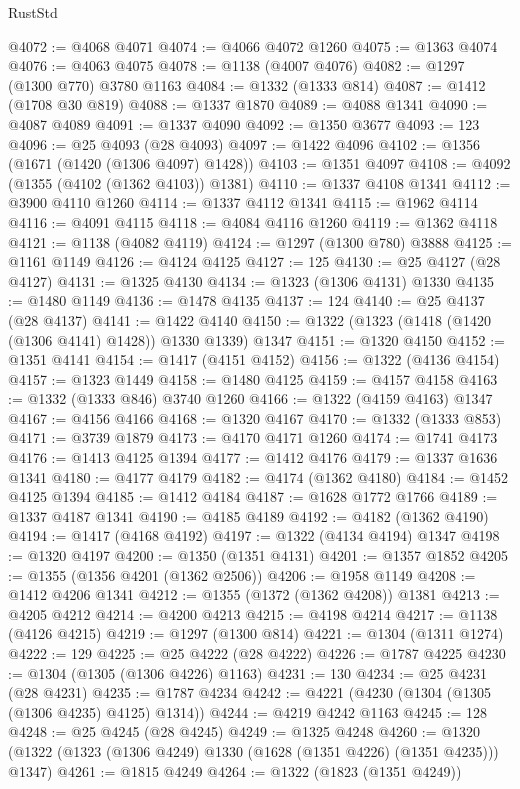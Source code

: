 \begin{lexlean}{RustStd}
\begin{coremodule}
{\begin{coremodule}
{{{{{{{{{{{{{{{{{{{{{{{{{{{{{{{{{{@4072 := @4068 @4071
@4074 := @4066 @4072 @1260
@4075 := @1363 @4074
@4076 := @4063 @4075
@4078 := @1138 (@4007 @4076)
@4082 := @1297 (@1300 @770) @3780 @1163
@4084 := @1332 (@1333 @814)
@4087 := @1412 (@1708 @30 @819)
@4088 := @1337 @1870
@4089 := @4088 @1341
@4090 := @4087 @4089
@4091 := @1337 @4090
@4092 := @1350 @3677
@4093 := 123
@4096 := @25 @4093 (@28 @4093)
@4097 := @1422 @4096
@4102 := @1356 (@1671 (@1420 (@1306 @4097) @1428))
@4103 := @1351 @4097
@4108 := @4092 (@1355 (@4102 (@1362 @4103)) @1381)
@4110 := @1337 @4108 @1341
@4112 := @3900 @4110 @1260
@4114 := @1337 @4112 @1341
@4115 := @1962 @4114
@4116 := @4091 @4115
@4118 := @4084 @4116 @1260
@4119 := @1362 @4118
@4121 := @1138 (@4082 @4119)
@4124 := @1297 (@1300 @780) @3888
@4125 := @1161 @1149
@4126 := @4124 @4125
@4127 := 125
@4130 := @25 @4127 (@28 @4127)
@4131 := @1325 @4130
@4134 := @1323 (@1306 @4131) @1330
@4135 := @1480 @1149
@4136 := @1478 @4135
@4137 := 124
@4140 := @25 @4137 (@28 @4137)
@4141 := @1422 @4140
@4150 := @1322 (@1323 (@1418 (@1420 (@1306 @4141) @1428)) @1330 @1339) @1347
@4151 := @1320 @4150
@4152 := @1351 @4141
@4154 := @1417 (@4151 @4152)
@4156 := @1322 (@4136 @4154)
@4157 := @1323 @1449
@4158 := @1480 @4125
@4159 := @4157 @4158
@4163 := @1332 (@1333 @846) @3740 @1260
@4166 := @1322 (@4159 @4163) @1347
@4167 := @4156 @4166
@4168 := @1320 @4167
@4170 := @1332 (@1333 @853)
@4171 := @3739 @1879
@4173 := @4170 @4171 @1260
@4174 := @1741 @4173
@4176 := @1413 @4125 @1394
@4177 := @1412 @4176
@4179 := @1337 @1636 @1341
@4180 := @4177 @4179
@4182 := @4174 (@1362 @4180)
@4184 := @1452 @4125 @1394
@4185 := @1412 @4184
@4187 := @1628 @1772 @1766
@4189 := @1337 @4187 @1341
@4190 := @4185 @4189
@4192 := @4182 (@1362 @4190)
@4194 := @1417 (@4168 @4192)
@4197 := @1322 (@4134 @4194) @1347
@4198 := @1320 @4197
@4200 := @1350 (@1351 @4131)
@4201 := @1357 @1852
@4205 := @1355 (@1356 @4201 (@1362 @2506))
@4206 := @1958 @1149
@4208 := @1412 @4206 @1341
@4212 := @1355 (@1372 (@1362 @4208)) @1381
@4213 := @4205 @4212
@4214 := @4200 @4213
@4215 := @4198 @4214
@4217 := @1138 (@4126 @4215)
@4219 := @1297 (@1300 @814)
@4221 := @1304 (@1311 @1274)
@4222 := 129
@4225 := @25 @4222 (@28 @4222)
@4226 := @1787 @4225
@4230 := @1304 (@1305 (@1306 @4226) @1163)
@4231 := 130
@4234 := @25 @4231 (@28 @4231)
@4235 := @1787 @4234
@4242 := @4221 (@4230 (@1304 (@1305 (@1306 @4235) @4125) @1314))
@4244 := @4219 @4242 @1163
@4245 := 128
@4248 := @25 @4245 (@28 @4245)
@4249 := @1325 @4248
@4260 := @1320 (@1322 (@1323 (@1306 @4249) @1330 (@1628 (@1351 @4226) (@1351 @4235))) @1347)
@4261 := @1815 @4249
@4264 := @1322 (@1823 (@1351 @4249))
}}}}}}}}}}}}}}}}}}}}}}}}}}}}}}}}}}
\end{coremodule}}
\end{coremodule}
\end{lexlean}
